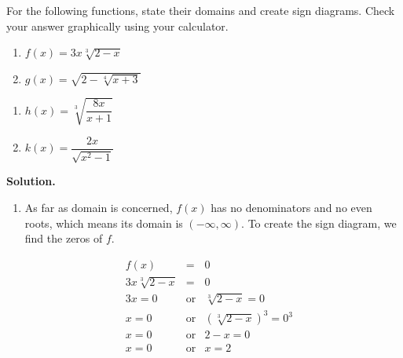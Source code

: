 \begin{ex}  For the following functions, state their domains and create sign diagrams.  Check your answer graphically using your calculator. 

\begin{multicols}{2}
\begin{enumerate}

\item  $f(x) = 3x \sqrt[3]{2-x}$

\item  $g(x) = \sqrt{2-\sqrt[4]{x+3}}$

\setcounter{HW}{\value{enumi}}
\end{enumerate}
\end{multicols}

\begin{multicols}{2}
\begin{enumerate}
\setcounter{enumi}{\value{HW}}

\item  $h(x) = \sqrt[3]{\dfrac{8x}{x+1}}$

\item  $k(x) = \dfrac{2x}{\sqrt{x^2 - 1}}$

\setcounter{HW}{\value{enumi}}
\end{enumerate}
\end{multicols}


{\bf Solution.}

\begin{enumerate}

\item  As far as domain is concerned, $f(x)$ has no denominators and no even roots, which means its domain is $(-\infty, \infty)$.  To create the sign diagram, we find the zeros of $f$.  

\[ \begin{array}{rclr}

f(x) & = & 0 & \\

3x \sqrt[3]{2-x} & = & 0 \\

3x = 0 & \mbox{or} & \sqrt[3]{2-x} = 0 & \\

x = 0 & \mbox{or} & \left(\sqrt[3]{2-x}\right)^3 = 0^3 & \\

x = 0 & \mbox{or} & 2-x = 0 & \\

x = 0 & \mbox{or} & x=2 & \\


\end{array}\]
\end{enumerate}
\end{ex}
